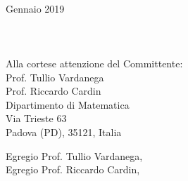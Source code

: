 \documentclass[11pt, a4paper]{letter} %
\begin{document}

\begin{letter}{
	\-\\ Gennaio 2019	
	\-\\\-\\\-\\\-\\
	Alla cortese attenzione del Committente:	\\
	Prof. Tullio Vardanega\\
	Prof. Riccardo Cardin\\	
	Dipartimento di Matematica\\ 
	Via Trieste 63\\ 
	Padova (PD), 35121, Italia
}


\opening{Egregio Prof.  Tullio Vardanega,\\
	Egregio Prof.  Riccardo Cardin,\\}


\end{letter}
\end{document}
